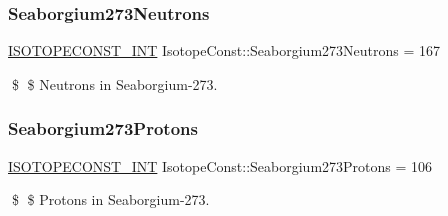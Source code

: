 \subsubsection{\texorpdfstring{Seaborgium273\+Neutrons}{Seaborgium273Neutrons}}
{\footnotesize\ttfamily \mbox{\hyperlink{group___isotope_const-_macros_ga5f18360b3e99483a35c32d789e62621c}{I\+S\+O\+T\+O\+P\+E\+C\+O\+N\+S\+T\+\_\+\+I\+NT}} Isotope\+Const\+::\+Seaborgium273\+Neutrons = 167}

\$ \$ Neutrons in Seaborgium-\/273. \mbox{\label{group___isotope_const-_seaborgium-_sg273_ga5d19818ac439a2564a9e7d640e632985}} 
\subsubsection{\texorpdfstring{Seaborgium273\+Protons}{Seaborgium273Protons}}
{\footnotesize\ttfamily \mbox{\hyperlink{group___isotope_const-_macros_ga5f18360b3e99483a35c32d789e62621c}{I\+S\+O\+T\+O\+P\+E\+C\+O\+N\+S\+T\+\_\+\+I\+NT}} Isotope\+Const\+::\+Seaborgium273\+Protons = 106}

\$ \$ Protons in Seaborgium-\/273. 